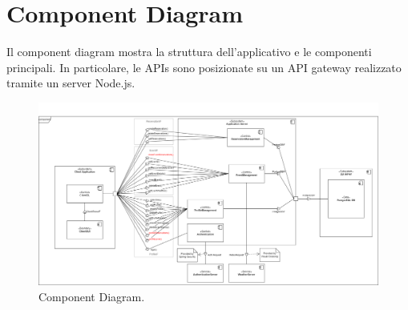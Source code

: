 \section{Component Diagram} 
Il component diagram mostra la struttura dell'applicativo e le componenti principali.
In particolare, le APIs sono posizionate su un API gateway realizzato tramite un server Node.js.
\begin{figure}[h!]
	\centering
	\includegraphics[width=0.8\linewidth]{Iterazione 3/images/Component.drawio.png}
	\caption{Component Diagram.}
	\label{fig:ComponentDiagramIt3}
\end{figure}
